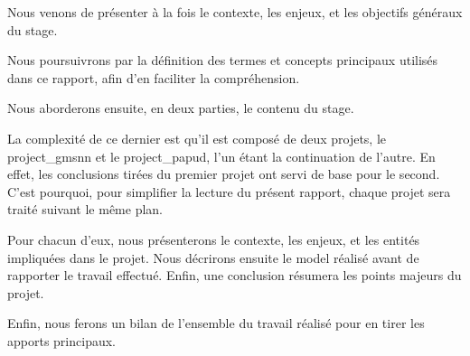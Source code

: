 
Nous venons de présenter à la fois le contexte, les enjeux, et les objectifs généraux du stage.

Nous poursuivrons par la définition des termes et concepts principaux utilisés dans ce rapport, afin d'en faciliter la compréhension.

Nous aborderons ensuite, en deux parties, le contenu du stage.

La complexité de ce dernier est qu'il est composé de deux projets, le \gls{project_gmsnn} et le \gls{project_papud}, l'un étant la continuation de l'autre. En effet, les conclusions tirées du premier projet ont servi de base pour le second. C'est pourquoi, pour simplifier la lecture du présent rapport, chaque projet sera traité suivant le même plan.

Pour chacun d'eux, nous présenterons le contexte, les enjeux, et les entités impliquées dans le projet. Nous décrirons ensuite le \gls{model} réalisé avant de rapporter le travail effectué. Enfin, une conclusion résumera les points majeurs du projet.

Enfin, nous ferons un bilan de l'ensemble du travail réalisé pour en tirer les apports principaux.



